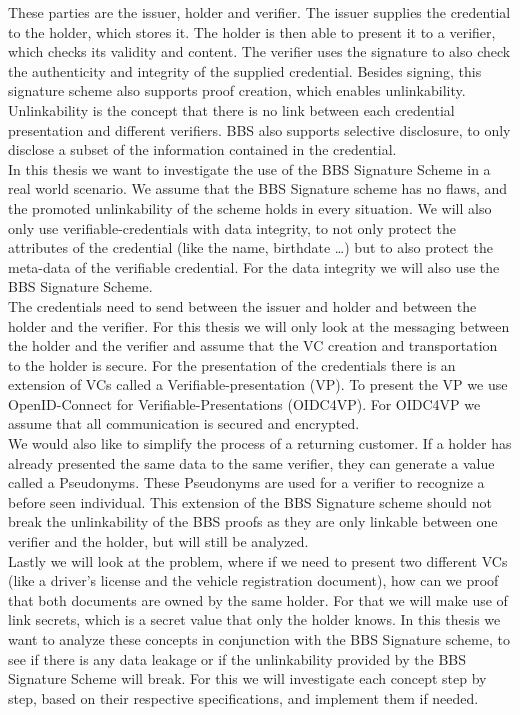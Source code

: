 \documentclass[
	a4paper               %
	,BCOR=0mm            %
	,bibliography=totoc   %
	,listof=totoc         %
	,monolingual
	,twoside=false
]{bfhthesis}              %
\begin{document}
These parties are the issuer, holder and verifier.
The issuer supplies the credential to the holder, which stores it. The holder is then able to present it to a verifier, which checks its validity and content.
The verifier uses the signature to also check the authenticity and integrity of the supplied credential.
Besides signing, this signature scheme also supports proof creation, which enables unlinkability.
Unlinkability is the concept that there is no link between each credential presentation and different verifiers.
BBS also supports selective disclosure, to only disclose a subset of the information contained in the credential.\\

In this thesis we want to investigate the use of the BBS Signature Scheme in a real world scenario.
We assume that the BBS Signature scheme has no flaws, and the promoted unlinkability of the scheme holds in every situation.
We will also only use verifiable-credentials with data integrity, to not only protect the attributes of the credential (like the name, birthdate \dots) but to also protect the meta-data of the verifiable credential.
For the data integrity we will also use the BBS Signature Scheme.\\

The credentials need to send between the issuer and holder and between the holder and the verifier.
For this thesis we will only look at the messaging between the holder and the verifier and assume that the VC creation and transportation to the holder is secure.
For the presentation of the credentials there is an extension of VCs called a Verifiable-presentation (VP)\cite{verifiable-credentials}.
To present the VP we use OpenID-Connect for Verifiable-Presentations (OIDC4VP)\cite{oidc4vp}.
For OIDC4VP we assume that all communication is secured and encrypted.\\

We would also like to simplify the process of a returning customer. 
If a holder has already presented the same data to the same verifier, they can generate a value called a Pseudonyms\cite{pseudonyms}.
These Pseudonyms are used for a verifier to recognize a before seen individual.
This extension of the BBS Signature scheme should not break the unlinkability of the BBS proofs as they are only linkable between one verifier and the holder, but will still be analyzed.\\

Lastly we will look at the problem, where if we need to present two different VCs (like a driver's license and the vehicle registration document), how can we proof that both documents are owned by the same holder.
For that we will make use of link secrets\cite{linksecrets}, which is a secret value that only the holder knows.
In this thesis we want to analyze these concepts in conjunction with the BBS Signature scheme, to see if there is any data leakage or if the unlinkability provided by the BBS Signature Scheme will break.
For this we will investigate each concept step by step, based on their respective specifications, and implement them if needed.
\end{document}
